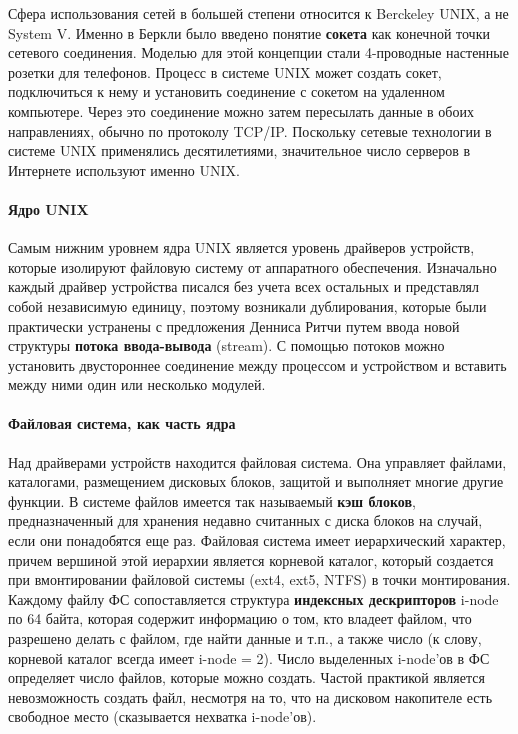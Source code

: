 \documentclass[10pt]{article}
\begin{document}
	Сфера использования сетей в большей степени относится к Berckeley UNIX, а не System V. Именно в Беркли было введено понятие \textbf{сокета} как конечной точки сетевого соединения. Моделью для этой концепции стали 4-проводные настенные розетки для телефонов. Процесс в системе UNIX может создать сокет, подключиться к нему и установить соединение с сокетом на удаленном компьютере. Через это соединение можно затем пересылать данные в обоих направлениях, обычно по протоколу TCP/IP. Поскольку сетевые технологии в системе UNIX применялись десятилетиями, значительное число серверов в Интернете используют именно UNIX.
	\paragraph{Ядро UNIX}
	Самым нижним уровнем ядра UNIX является уровень драйверов устройств, которые изолируют файловую систему от аппаратного обеспечения. Изначально каждый драйвер устройства писался без учета всех остальных и представлял собой независимую единицу, поэтому возникали дублирования, которые были практически устранены с предложения Денниса Ритчи путем ввода новой структуры \textbf{потока ввода-вывода} (stream). С помощью потоков можно установить двустороннее соединение между процессом и устройством и вставить между ними один или несколько модулей.

	\paragraph{Файловая система, как часть ядра}
	Над драйверами устройств находится файловая система. Она управляет файлами, каталогами, размещением дисковых блоков, защитой и выполняет многие другие функции. В системе файлов имеется так называемый \textbf{кэш блоков}, предназначенный для хранения недавно считанных с диска блоков на случай, если они понадобятся еще раз. Файловая система имеет иерархический характер, причем вершиной этой иерархии является корневой каталог, который создается при вмонтировании файловой системы (ext4, ext5, NTFS) в точки монтирования. Каждому файлу ФС сопоставляется структура \textbf{индексных дескрипторов} i-node по 64 байта, которая содержит информацию о том, кто владеет файлом, что разрешено делать с файлом, где найти данные и т.п., а также число (к слову, корневой каталог всегда имеет i-node = 2). Число выделенных i-node'ов в ФС определяет число файлов, которые можно создать. Частой практикой является невозможность создать файл, несмотря на то, что на дисковом накопителе есть свободное место (сказывается нехватка i-node'ов).
\end{document}
